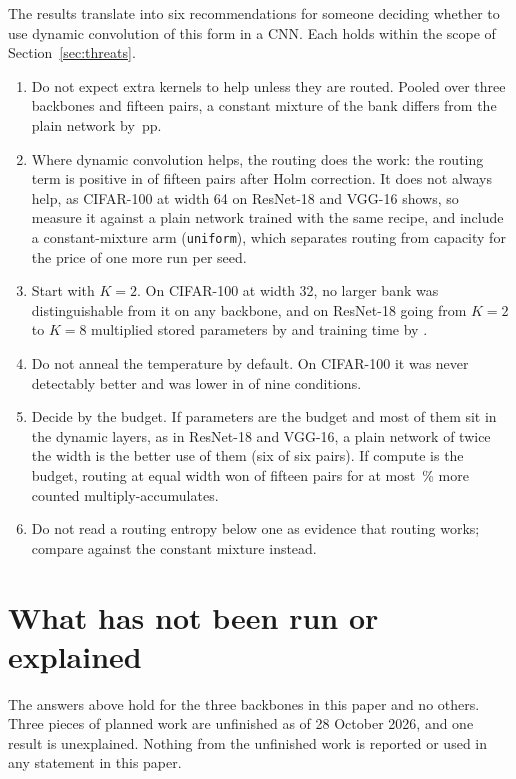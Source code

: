 \documentclass[10pt,a4paper]{article}
\begin{document}
The results translate into six recommendations for someone deciding
whether to use dynamic convolution of this form in a CNN. Each holds within
the scope of Section~\ref{sec:threats}.
\begin{enumerate}\setlength\itemsep{2pt}
\item Do not expect extra kernels to help unless they are routed. Pooled
over three backbones and fifteen pairs, a constant mixture of the bank
differs from the plain network by \,pp.
\item Where dynamic convolution helps, the routing does the work: the
routing term is positive in  of fifteen pairs after Holm
correction. It does not always help, as CIFAR-100 at width 64 on ResNet-18
and VGG-16 shows, so measure it against a plain network trained with the
same recipe, and include a constant-mixture arm (\texttt{uniform}), which
separates routing from capacity for the price of one more run per seed.
\item Start with $K=2$. On CIFAR-100 at width 32, no larger bank was
distinguishable from it on any backbone, and on ResNet-18 going from $K=2$
to $K=8$ multiplied stored parameters by  and training time by
.
\item Do not anneal the temperature by default. On CIFAR-100 it was never
detectably better and was lower in  of nine conditions.
\item Decide by the budget. If parameters are the budget and most of them
sit in the dynamic layers, as in ResNet-18 and VGG-16, a plain network of
twice the width is the better use of them (six of six pairs). If compute
is the budget, routing at equal width won  of fifteen pairs for
at most \,\% more counted multiply-accumulates.
\item Do not read a routing entropy below one as evidence that routing
works; compare against the constant mixture instead.
\end{enumerate}

\section{What has not been run or explained}\label{sec:open}

The answers above hold for the three backbones in this paper and no others.
Three pieces of planned work are unfinished as of 28 October 2026, and one
result is unexplained. Nothing from the unfinished work is reported or used
in any statement in this paper.
\end{document}
